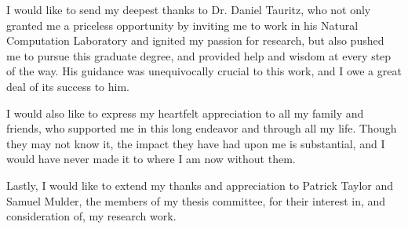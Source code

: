 \documentclass[times,12pt,titlepage]{mstogs}
\begin{document}

\begin{ThesisAcknowledgment}
I would like to send my deepest thanks to Dr. Daniel Tauritz, who not only granted me a priceless opportunity by inviting me to work in his Natural Computation Laboratory and ignited my passion for research, but also pushed me to pursue this graduate degree, and provided help and wisdom at every step of the way. His guidance was unequivocally crucial to this work, and I owe a great deal of its success to him.

I would also like to express my heartfelt appreciation to all my family and friends, who supported me in this long endeavor and through all my life. Though they may not know it, the impact they have had upon me is substantial, and I would have never made it to where I am now without them.

Lastly, I would like to extend my thanks and appreciation to Patrick Taylor and Samuel Mulder, the members of my thesis committee, for their interest in, and consideration of, my research work.

\end{ThesisAcknowledgment}

\begin{ThesisFrontMatter}
\tableofcontents
\listoffigures
\listoftables
\end{ThesisFrontMatter}
\end{document}
